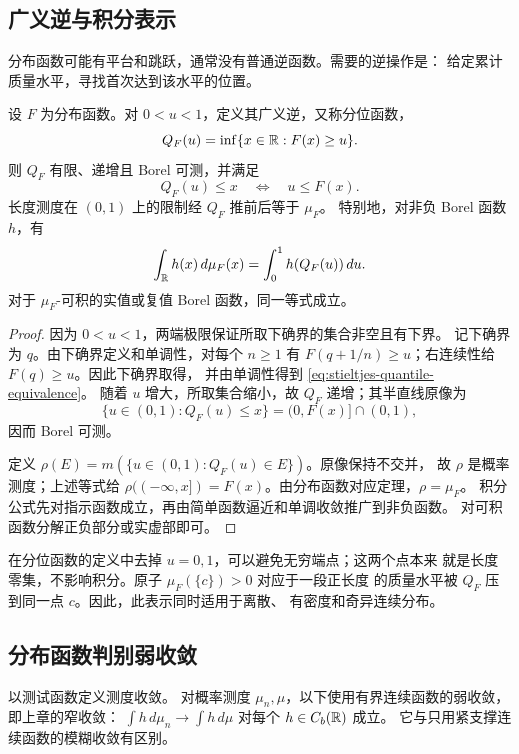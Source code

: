 \subsection{广义逆与积分表示}

分布函数可能有平台和跳跃，通常没有普通逆函数。需要的逆操作是：
给定累计质量水平，寻找首次达到该水平的位置。

\begin{theorem}[分位函数表示]\label{thm:stieltjes-quantile}
设 \(F\) 为分布函数。对 \(0<u<1\)，定义其广义逆，又称分位函数，
\[
 Q_F(u)=\inf\{x\in\mathbb{R}:F(x)\ge u\}.
\]
则 \(Q_F\) 有限、递增且 Borel 可测，并满足
\begin{equation}\label{eq:stieltjes-quantile-equivalence}
 Q_F(u)\le x\quad\Longleftrightarrow\quad u\le F(x).
\end{equation}
长度测度在 \((0,1)\) 上的限制经 \(Q_F\) 推前后等于 \(\mu_F\)。
特别地，对非负 Borel 函数 \(h\)，有
\begin{equation}\label{eq:stieltjes-quantile-integral}
 \int_{\mathbb{R}} h(x)\,d\mu_F(x)=\int_0^1h(Q_F(u))\,du.
\end{equation}
对于 \(\mu_F\)-可积的实值或复值 Borel 函数，同一等式成立。
\end{theorem}
\begin{proof}
因为 \(0<u<1\)，两端极限保证所取下确界的集合非空且有下界。
记下确界为 \(q\)。由下确界定义和单调性，对每个 \(n\ge1\) 有
\(F(q+1/n)\ge u\)；右连续性给 \(F(q)\ge u\)。因此下确界取得，
并由单调性得到 \eqref{eq:stieltjes-quantile-equivalence}。
随着 \(u\) 增大，所取集合缩小，故 \(Q_F\) 递增；其半直线原像为
\[
 \{u\in(0,1):Q_F(u)\le x\}=(0,F(x)]\cap(0,1),
\]
因而 Borel 可测。

定义 \(\rho(E)=m(\{u\in(0,1):Q_F(u)\in E\})\)。原像保持不交并，
故 \(\rho\) 是概率测度；上述等式给
\(\rho(({-\infty},x])=F(x)\)。由分布函数对应定理，\(\rho=\mu_F\)。
积分公式先对指示函数成立，再由简单函数逼近和单调收敛推广到非负函数。
对可积函数分解正负部分或实虚部即可。
\end{proof}

在分位函数的定义中去掉 \(u=0,1\)，可以避免无穷端点；这两个点本来
就是长度零集，不影响积分。原子 \(\mu_F(\{c\})>0\) 对应于一段正长度
的质量水平被 \(Q_F\) 压到同一点 \(c\)。因此，此表示同时适用于离散、
有密度和奇异连续分布。

\subsection{分布函数判别弱收敛}

以测试函数定义测度收敛。
对概率测度 \(\mu_n,\mu\)，以下使用有界连续函数的弱收敛，即上章的窄收敛：
\(\int h\,d\mu_n\to\int h\,d\mu\) 对每个 \(h\in C_b(\mathbb{R})\) 成立。
它与只用紧支撑连续函数的模糊收敛有区别。

